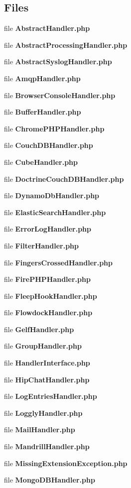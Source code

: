 \subsection*{Files}
\begin{DoxyCompactItemize}
\item 
file {\bf Abstract\+Handler.\+php}
\item 
file {\bf Abstract\+Processing\+Handler.\+php}
\item 
file {\bf Abstract\+Syslog\+Handler.\+php}
\item 
file {\bf Amqp\+Handler.\+php}
\item 
file {\bf Browser\+Console\+Handler.\+php}
\item 
file {\bf Buffer\+Handler.\+php}
\item 
file {\bf Chrome\+P\+H\+P\+Handler.\+php}
\item 
file {\bf Couch\+D\+B\+Handler.\+php}
\item 
file {\bf Cube\+Handler.\+php}
\item 
file {\bf Doctrine\+Couch\+D\+B\+Handler.\+php}
\item 
file {\bf Dynamo\+Db\+Handler.\+php}
\item 
file {\bf Elastic\+Search\+Handler.\+php}
\item 
file {\bf Error\+Log\+Handler.\+php}
\item 
file {\bf Filter\+Handler.\+php}
\item 
file {\bf Fingers\+Crossed\+Handler.\+php}
\item 
file {\bf Fire\+P\+H\+P\+Handler.\+php}
\item 
file {\bf Fleep\+Hook\+Handler.\+php}
\item 
file {\bf Flowdock\+Handler.\+php}
\item 
file {\bf Gelf\+Handler.\+php}
\item 
file {\bf Group\+Handler.\+php}
\item 
file {\bf Handler\+Interface.\+php}
\item 
file {\bf Hip\+Chat\+Handler.\+php}
\item 
file {\bf Log\+Entries\+Handler.\+php}
\item 
file {\bf Loggly\+Handler.\+php}
\item 
file {\bf Mail\+Handler.\+php}
\item 
file {\bf Mandrill\+Handler.\+php}
\item 
file {\bf Missing\+Extension\+Exception.\+php}
\item 
file {\bf Mongo\+D\+B\+Handler.\+php}

\end{DoxyCompactItemize}
